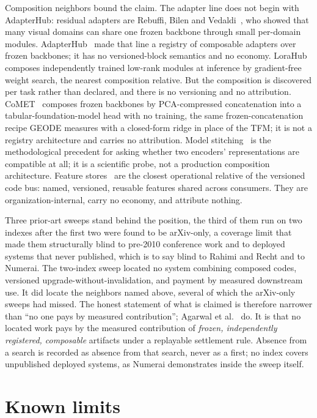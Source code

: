 \documentclass[11pt]{article}
\begin{document}
Composition neighbors bound the claim. The adapter line does not
begin with AdapterHub: residual adapters are Rebuffi, Bilen and
Vedaldi~\cite{rebuffi2017}, who showed that many visual domains
can share one frozen backbone through small per-domain modules.
AdapterHub~\cite{ruckle2020} made that line a registry of
composable adapters over frozen backbones; it has no
versioned-block semantics and no economy.
LoraHub~\cite{lorahub2023} composes independently trained
low-rank modules at inference by gradient-free weight search, the
nearest composition relative. But the composition is
discovered per task rather than declared, and there is no
versioning and no attribution.
CoMET~\cite{comet2026} composes frozen backbones by
PCA-compressed concatenation into a tabular-foundation-model head
with no training, the same frozen-concatenation recipe GEODE
measures with a closed-form ridge in place of the TFM; it is not
a registry architecture and carries no attribution. Model
stitching~\cite{bansal2023} is the methodological precedent for
asking whether two encoders' representations are compatible at
all; it is a scientific probe, not a production composition
architecture. Feature stores~\cite{michelangelo2017} are the
closest operational relative of the versioned code bus: named,
versioned, reusable features shared across consumers. They are
organization-internal, carry no economy, and attribute nothing.

Three prior-art sweeps stand behind the position, the third of
them run on two indexes after the first two were found to be
arXiv-only, a coverage limit that made them structurally blind
to pre-2010 conference work and to deployed systems that never
published, which is to say blind to Rahimi and Recht and to
Numerai. The two-index sweep located no system combining composed
codes, versioned upgrade-without-invalidation, and payment by
measured downstream use. It did locate the neighbors named above,
several of which the arXiv-only sweeps had missed. The honest
statement of what is claimed is therefore narrower than ``no one
pays by measured contribution''; Agarwal et
al.~\cite{agarwal2019} do. It is that no located work pays by the
measured contribution of \emph{frozen, independently registered,
    composable} artifacts under a replayable settlement rule. Absence
from a search is recorded as absence from that search, never as a
first; no index covers unpublished deployed systems, as Numerai
demonstrates inside the sweep itself.

\section{Known limits}\label{sec:limits}
\end{document}
